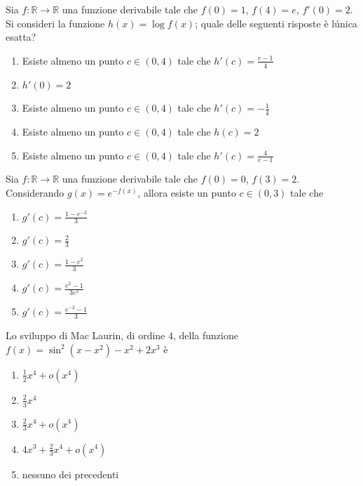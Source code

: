 \begin{quiz}
Sia $f:\mathbb R\to\mathbb R$ una funzione derivabile tale che $f(0)=1$, $f(4)=e$, $f\prime(0)=2$. Si consideri la funzione $h(x)=\log f(x)$; quale delle seguenti risposte \`e l\'unica esatta?
\begin{enumerate}
\item Esiste almeno un punto $c\in(0,4)$ tale che $h\prime(c)=\frac{e-1}4$
\item $h\prime(0)=2$
\item Esiste almeno un punto $c\in(0,4)$ tale che $h\prime(c)=-\frac14$
\item Esiste almeno un punto $c\in(0,4)$ tale che $h(c)=2$
\item Esiste almeno un punto $c\in(0,4)$ tale che $h\prime(c)=\frac4{e-1}$
\end{enumerate}
\end{quiz}

\begin{quiz}
Sia $f:\mathbb R\to\mathbb R$ una funzione derivabile tale che $f(0)=0$, $f(3)=2$. Considerando $g(x)=e^{-f(x)}$, allora esiste un punto $c\in(0,3)$ tale che
\begin{enumerate}
\item $g\prime(c)=\frac{1-e^{-2}}3$
\item $g\prime(c)=\frac23$
\item $g\prime(c)=\frac{1-e^2}3$
\item $g\prime(c)=\frac{e^2-1}{3e^2}$
\item $g\prime(c)=\frac{e^{-2}-1}3$
\end{enumerate}
\end{quiz}

\begin{quiz}
Lo sviluppo di Mac Laurin, di ordine $4$, della funzione $f(x)=\sin^2(x-x^2)-x^2+2x^3$ \`e
\begin{enumerate}
\item $\frac12x^4+o(x^4)$
\item $\frac23x^4$
\item $\frac23x^4+o(x^4)$
\item $4x^3+\frac23x^4+o(x^4)$
\item nessuno dei precedenti
\end{enumerate}
\end{quiz}

